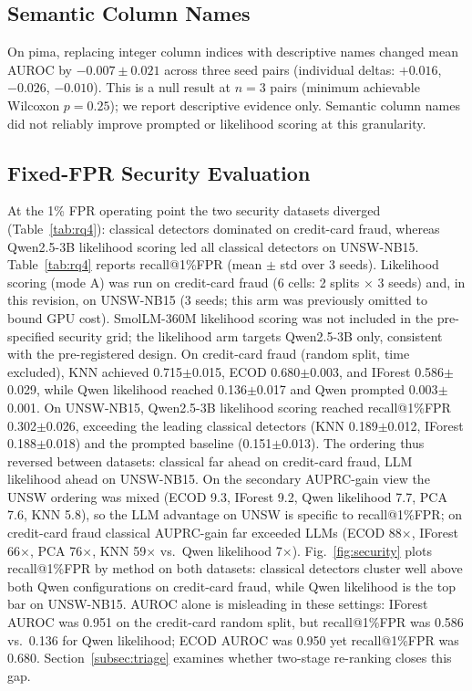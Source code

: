 \documentclass[conference]{IEEEtran}
\begin{document}
\subsection{Semantic Column Names}
On pima, replacing integer column indices with descriptive names changed mean AUROC by $-0.007\pm0.021$ across three seed pairs (individual deltas: $+0.016$, $-0.026$, $-0.010$).
This is a null result at $n=3$ pairs (minimum achievable Wilcoxon $p=0.25$); we report descriptive evidence only.
Semantic column names did not reliably improve prompted or likelihood scoring at this granularity.

\subsection{Fixed-FPR Security Evaluation}
At the 1\% FPR operating point the two security datasets diverged (Table~\ref{tab:rq4}): classical detectors dominated on credit-card fraud, whereas Qwen2.5-3B likelihood scoring led all classical detectors on UNSW-NB15.
Table~\ref{tab:rq4} reports recall@1\%FPR (mean $\pm$ std over 3 seeds).
Likelihood scoring (mode A) was run on credit-card fraud (6 cells: 2 splits $\times$ 3 seeds) and, in this revision, on UNSW-NB15 (3 seeds; this arm was previously omitted to bound GPU cost).
SmolLM-360M likelihood scoring was not included in the pre-specified security grid; the likelihood arm targets Qwen2.5-3B only, consistent with the pre-registered design.
On credit-card fraud (random split, time excluded), KNN achieved 0.715$\pm$0.015, ECOD 0.680$\pm$0.003, and IForest 0.586$\pm$0.029, while Qwen likelihood reached 0.136$\pm$0.017 and Qwen prompted 0.003$\pm$0.001.
On UNSW-NB15, Qwen2.5-3B likelihood scoring reached recall@1\%FPR 0.302$\pm$0.026, exceeding the leading classical detectors (KNN 0.189$\pm$0.012, IForest 0.188$\pm$0.018) and the prompted baseline (0.151$\pm$0.013).
The ordering thus reversed between datasets: classical far ahead on credit-card fraud, LLM likelihood ahead on UNSW-NB15.
On the secondary AUPRC-gain view the UNSW ordering was mixed (ECOD 9.3, IForest 9.2, Qwen likelihood 7.7, PCA 7.6, KNN 5.8), so the LLM advantage on UNSW is specific to recall@1\%FPR; on credit-card fraud classical AUPRC-gain far exceeded LLMs (ECOD 88$\times$, IForest 66$\times$, PCA 76$\times$, KNN 59$\times$ vs.\ Qwen likelihood 7$\times$).
Fig.~\ref{fig:security} plots recall@1\%FPR by method on both datasets: classical detectors cluster well above both Qwen configurations on credit-card fraud, while Qwen likelihood is the top bar on UNSW-NB15.
AUROC alone is misleading in these settings: IForest AUROC was 0.951 on the credit-card random split, but recall@1\%FPR was 0.586 vs.\ 0.136 for Qwen likelihood; ECOD AUROC was 0.950 yet recall@1\%FPR was 0.680.
Section~\ref{subsec:triage} examines whether two-stage re-ranking closes this gap.
\end{document}
